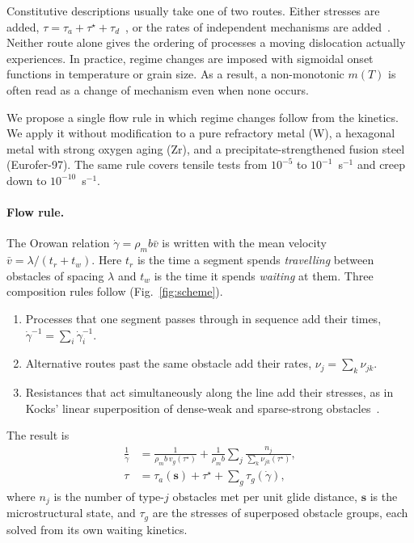 \documentclass[aps,prl,twocolumn,superscriptaddress,amsmath,amssymb,floatfix]{revtex4-2}
\newcommand{\gd}{\dot\gamma}
\newcommand{\ts}{\tau^{\star}}
\begin{document}
Constitutive descriptions usually take one of two routes. Either stresses are added, $\tau=\tau_a+\ts+\tau_d$~\cite{Seeger,KocksArgonAshby,EstrinMcCormick}, or the rates of independent mechanisms are added~\cite{FrostAshby}. Neither route alone gives the ordering of processes a moving dislocation actually experiences. In practice, regime changes are imposed with sigmoidal onset functions in temperature or grain size. As a result, a non-monotonic $m(T)$ is often read as a change of mechanism even when none occurs.

We propose a single flow rule in which regime changes follow from the kinetics. We apply it without modification to a pure refractory metal (W), a hexagonal metal with strong oxygen aging (Zr), and a precipitate-strengthened fusion steel (Eurofer-97). The same rule covers tensile tests from $10^{-5}$ to $10^{-1}$~s$^{-1}$ and creep down to $10^{-10}$~s$^{-1}$.

\paragraph{Flow rule.}
The Orowan relation $\gd=\rho_m b\bar v$ is written with the mean velocity $\bar v=\lambda/(t_r+t_w)$. Here $t_r$ is the time a segment spends \emph{travelling} between obstacles of spacing $\lambda$ and $t_w$ is the time it spends \emph{waiting} at them. Three composition rules follow (Fig.~\ref{fig:scheme}).
\begin{enumerate}
  \item[(S)] Processes that one segment passes through in sequence add their times, $\gd^{-1}=\sum_i\gd_i^{-1}$.
  \item[(P)] Alternative routes past the same obstacle add their rates, $\nu_j=\sum_k\nu_{jk}$.
  \item[(L)] Resistances that act simultaneously along the line add their stresses, as in Kocks' linear superposition of dense-weak and sparse-strong obstacles~\cite{KocksArgonAshby}.
\end{enumerate}
The result is
\begin{align}
\frac{1}{\gd}&=\frac{1}{\rho_m b\,v_g(\ts)}+\frac{1}{\rho_m b}\sum_j\frac{n_j}{\sum_k\nu_{jk}(\ts)},\label{eq:flow}\\
\tau&=\tau_a(\bm s)+\ts+\sum_g\tau_g(\gd),\label{eq:tau}
\end{align}
where $n_j$ is the number of type-$j$ obstacles met per unit glide distance, $\bm s$ is the microstructural state, and $\tau_g$ are the stresses of superposed obstacle groups, each solved from its own waiting kinetics.
\end{document}
